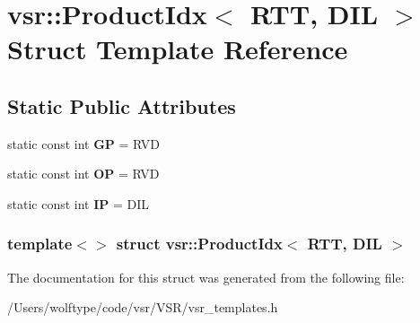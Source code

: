 \hypertarget{structvsr_1_1_product_idx_3_01_r_t_t_00_01_d_i_l_01_4}{\section{vsr\-:\-:Product\-Idx$<$ R\-T\-T, D\-I\-L $>$ Struct Template Reference}
\label{structvsr_1_1_product_idx_3_01_r_t_t_00_01_d_i_l_01_4}
}
\subsection*{Static Public Attributes}
\begin{DoxyCompactItemize}
\item 
\hypertarget{structvsr_1_1_product_idx_3_01_r_t_t_00_01_d_i_l_01_4_a2d35e6ce73bb7f43d75cefc1ccc968b7}{static const int {\bfseries G\-P} = R\-V\-D}\label{structvsr_1_1_product_idx_3_01_r_t_t_00_01_d_i_l_01_4_a2d35e6ce73bb7f43d75cefc1ccc968b7}

\item 
\hypertarget{structvsr_1_1_product_idx_3_01_r_t_t_00_01_d_i_l_01_4_ade26c8d68e6a6a2065e14c6378ccb821}{static const int {\bfseries O\-P} = R\-V\-D}\label{structvsr_1_1_product_idx_3_01_r_t_t_00_01_d_i_l_01_4_ade26c8d68e6a6a2065e14c6378ccb821}

\item 
\hypertarget{structvsr_1_1_product_idx_3_01_r_t_t_00_01_d_i_l_01_4_a5ba04e539b6aa942dd8c1b21c6beda53}{static const int {\bfseries I\-P} = D\-I\-L}\label{structvsr_1_1_product_idx_3_01_r_t_t_00_01_d_i_l_01_4_a5ba04e539b6aa942dd8c1b21c6beda53}

\end{DoxyCompactItemize}
\subsubsection*{template$<$$>$ struct vsr\-::\-Product\-Idx$<$ R\-T\-T, D\-I\-L $>$}



The documentation for this struct was generated from the following file\-:\begin{DoxyCompactItemize}
\item 
/\-Users/wolftype/code/vsr/\-V\-S\-R/vsr\-\_\-templates.\-h\end{DoxyCompactItemize}
